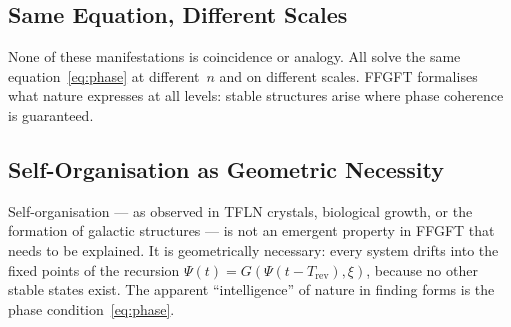 \subsection{Same Equation, Different Scales}

\begin{table}[H]
\centering
\caption{Manifestation of the phase condition on different scales}
\smallskip
{}
\end{table}

\begin{keybox}
None of these manifestations is coincidence or analogy. All solve
the same equation~\eqref{eq:phase} at different~$n$ and on different
scales. FFGFT formalises what nature expresses at all levels: stable
structures arise where phase coherence is guaranteed.
\end{keybox}

\subsection{Self-Organisation as Geometric Necessity}

Self-organisation — as observed in TFLN crystals, biological growth,
or the formation of galactic structures — is not an emergent property
in FFGFT that needs to be explained. It is geometrically necessary:
every system drifts into the fixed points of the recursion
$\Psi(t) = G(\Psi(t-T_\text{rev}), \xi)$, because no other stable
states exist. The apparent ``intelligence'' of nature in finding
forms is the phase condition~\eqref{eq:phase}.

